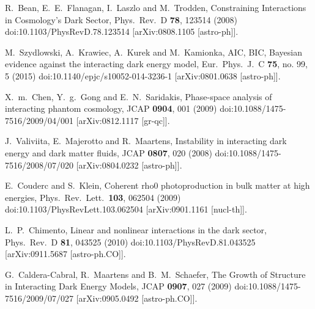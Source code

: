 \documentclass[aps,prd,nofootinbib,amsmath,amssymb,superscriptaddress,twocolumn,10pt]{revtex4}%
\begin{document}
\begin{thebibliography}{99}
  R.~Bean, E.~E.~Flanagan, I.~Laszlo and M.~Trodden,
  Constraining Interactions in Cosmology's Dark Sector,
  Phys.\ Rev.\ D {\bf 78}, 123514 (2008)
  doi:10.1103/PhysRevD.78.123514
  [arXiv:0808.1105 [astro-ph]].

  M.~Szydlowski, A.~Krawiec, A.~Kurek and M.~Kamionka,
  AIC, BIC, Bayesian evidence against the interacting dark energy model,
  Eur.\ Phys.\ J.\ C {\bf 75}, no. 99, 5 (2015)
  doi:10.1140/epjc/s10052-014-3236-1
  [arXiv:0801.0638 [astro-ph]].

  X.~m.~Chen, Y.~g.~Gong and E.~N.~Saridakis,
  Phase-space analysis of interacting phantom cosmology,
  JCAP {\bf 0904}, 001 (2009)
  doi:10.1088/1475-7516/2009/04/001
  [arXiv:0812.1117 [gr-qc]].

  J.~Valiviita, E.~Majerotto and R.~Maartens,
  Instability in interacting dark energy and dark matter fluids,
  JCAP {\bf 0807}, 020 (2008)
  doi:10.1088/1475-7516/2008/07/020
  [arXiv:0804.0232 [astro-ph]].

  E.~Couderc and S.~Klein,
  Coherent rho0 photoproduction in bulk matter at high energies,
  Phys.\ Rev.\ Lett.\  {\bf 103}, 062504 (2009)
  doi:10.1103/PhysRevLett.103.062504
  [arXiv:0901.1161 [nucl-th]].

  L.~P.~Chimento,
  Linear and nonlinear interactions in the dark sector,
  Phys.\ Rev.\ D {\bf 81}, 043525 (2010)
  doi:10.1103/PhysRevD.81.043525
  [arXiv:0911.5687 [astro-ph.CO]].

  G.~Caldera-Cabral, R.~Maartens and B.~M.~Schaefer,
  The Growth of Structure in Interacting Dark Energy Models,
  JCAP {\bf 0907}, 027 (2009)
  doi:10.1088/1475-7516/2009/07/027
  [arXiv:0905.0492 [astro-ph.CO]].


\end{thebibliography}
\end{document}
